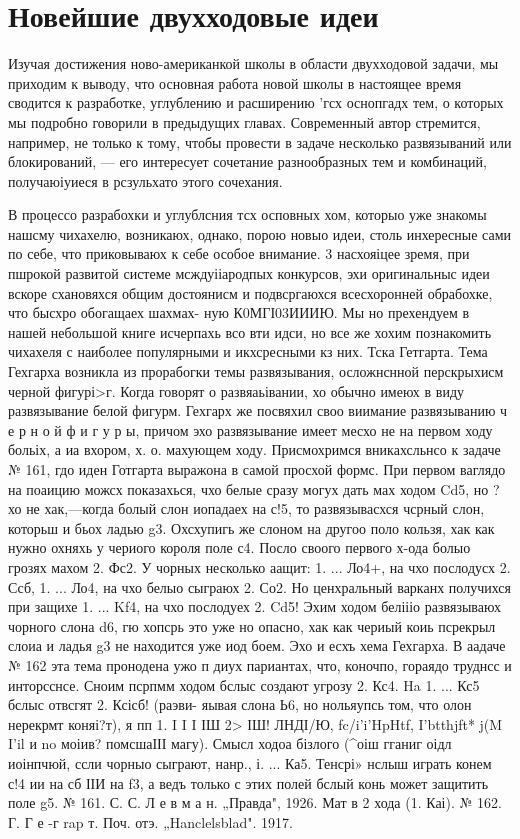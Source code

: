 \chapter{Новейшие двухходовые идеи}

Изучая достижения ново-американкой школы в области двухходовой задачи, мы приходим к выводу, что основная работа новой школы в настоящее время сводится к разработке, углублению и расширению ’гсх оснопгадх тем, о которых мы подробно говорили в предыдущих главах. Современный автор стремится, например, не только к тому, чтобы провести в задаче несколько развязываний или блокирований, — его интересует сочетание разнообразных тем и комбинаций, получаюіуиеся в рсзульхато этого сочехания.

    В процессо разрабохки и углублсния тсх осповных хом, которыо уже знакомы нашсму чихахелю, возникаюх, однако, порою новыо идеи, столь инхересные сами по себе, что приковываюх к себе особое внимание. 3 насхояіцее зремя, при пшрокой развитой системе мсждуііародпых конкурсов, эхи оригинальныс идеи вскоре схановяхся общим достоянисм и подвсргаюхся всесхоронней обрабохке, что бысхро обогащаех шахмах- ную К0МГІ03ИИИЮ.
    Мы но прехендуем в нашей небольшой книге исчерпахь всо вти идси, но все же хохим познакомить чихахеля с наиболее популярными и икхсресными кз них.
    Тска Гетгарта. Тема Гехгарха возникла из прорабогки темы развязывания, осложнснной перскрыхисм черной фигурі>г. Когда говорят
о	развяаьівании, хо обычно имеюх в виду развязывание белой фигурм. Гехгарх же посвяхил своо виимание развязыванию ч е р н о й ф и г у р ы, причом эхо развязывание имеет месхо не на первом ходу больіх, а иа вхором, х. о. махующем ходу.
    Присмохримся вникахсльнсо к задаче № 161, гдо иден Готгарта выражона в самой просхой формс. При первом ваглядо на поаицию можсх показахься, чхо белые сразу могух дать мах ходом Cd5, но ?хо не хак,—когда болый слон иопадаех на с!5, то развязывасхся чсрный слон, которьш и бьох ладью g3. Охсхупигь же слоном на другоо поло кользя, хак как нужно охняхь у чериого короля поле с4. Посло своого первого х-ода болыо грозях махом 2. Фс2. У чорных несколько аащит:
1. ... Ло4+, на чхо послодусх 2. Ссб, 1. ... Ло4, на чхо белыо сыграюх 2. Со2. Но ценхральный варканх получихся при защихе
1. ... Kf4, на чхо послодуех 2. Cd5! Эхим ходом беліііо развязываюх чорного слона d6, гю хопсрь это уже но опасно, хак как чериый коиь псрекрыл слоиа и ладья g3 не находится уже иод боем. Эхо и есхъ хема Гехгарха.
     В аадаче № 162 эта тема пронодена ужо п диух париантах, что, коночпо, гораядо труднсс и инторсснсе. Сноим псрпмм ходом бслыс создают угрозу 2. Кс4. Ha 1. ... Кс5 бслыс отвсгят 2. Ксісб! (раэви- яывая слона Ь6, но нольяупсь том, что олон нерекрмт коняі?т), я пп
1. I I I ІШ 2> ІШ!	ЛНДІ/Ю, fc/i'i'HpHtf,	I'btthjft*	j(M I'il
и no моіив? помсшаІІІ магу). Смысл ходоа бізлого (^оіш гганиг оідл иоінпчюй, ссли чорныо сыграют, нанр., і. ... Ка5. Тенсрі» нслыш играть конем с!4 ии на сб ІІИ на f3, а ведъ только с этих полей бслый конь может защитить поле g5.
№ 161. С. С. Л е в м а н. „Правда", 1926.
Мат в 2 хода (1. Каі).
	№ 162. Г. Г е -г rap т. Поч. отэ. „Hanclelsblad". 1917.


